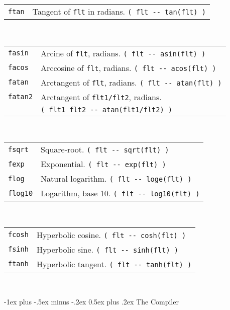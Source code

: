 \documentclass[10pt,landscape,a4paper]{article}
\makeatletter
\renewcommand{\section}{\@startsection{section}{1}{0mm}%
                                {-1ex plus -.5ex minus -.2ex}%
                                {0.5ex plus .2ex}%
                                {\normalfont\large\bfseries}}
\makeatother
\begin{document}
\begin{multicols}{3}
\begin{tabular}{@{}ll@{}}
\verb!ftan! & Tangent of \verb!flt! in radians. \verb!( flt -- tan(flt) )! \\
\end{tabular}\\
\begin{tabular}{@{}ll@{}}
\verb!fasin! & Arcine of \verb!flt!, radians. \verb!( flt -- asin(flt) )! \\
\verb!facos! & Arccosine of \verb!flt!, radians. \verb!( flt -- acos(flt) )! \\
\verb!fatan! & Arctangent of \verb!flt!, radians. \verb!( flt -- atan(flt) )! \\
\verb!fatan2! & Arctangent of \verb!flt1/flt2!, radians. \\
              & \verb!( flt1 flt2 -- atan(flt1/flt2) )! \\
\end{tabular}\\
\begin{tabular}{@{}ll@{}}
\verb!fsqrt! & Square-root. \verb!( flt -- sqrt(flt) )! \\
\verb!fexp! & Exponential. \verb!( flt -- exp(flt) )! \\
\verb!flog! & Natural logarithm. \verb!( flt -- loge(flt) )! \\
\verb!flog10! & Logarithm, base 10. \verb!( flt -- log10(flt) )! \\
\end{tabular}\\
\begin{tabular}{@{}ll@{}}
\verb!fcosh! & Hyperbolic cosine. \verb!( flt -- cosh(flt) )! \\
\verb!fsinh! & Hyperbolic sine. \verb!( flt -- sinh(flt) )! \\
\verb!ftanh! & Hyperbolic tangent. \verb!( flt -- tanh(flt) )! \\
\end{tabular}\\

\bigskip

\section{The Compiler}


\end{multicols}
\end{document}
